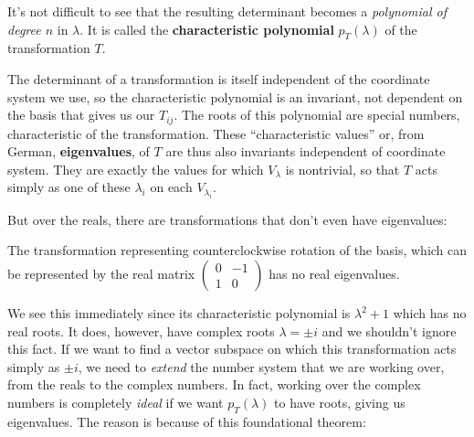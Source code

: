	 It's not difficult to see that the resulting determinant becomes a \emph{polynomial of degree $n$} in $\lambda$. It is called the \textbf{characteristic polynomial} $p_T(\lambda)$ of the transformation $T$.
	 
	 The determinant of a transformation is itself independent of the coordinate system we use, so the characteristic polynomial is an invariant, not dependent on the basis that gives us our $T_{ij}$. The roots of this polynomial are special numbers, characteristic of the transformation. These ``characteristic values'' or, from German, \textbf{eigenvalues}, of $T$ are thus also invariants independent of coordinate system. They are exactly the values for which $V_\lambda$ is nontrivial, so that $T$ acts simply as one of these $\lambda_i$ on each $V_{\lambda_i}$. 
	 
	 But over the reals, there are transformations that don't even have eigenvalues:
	 \begin{example}
	 	The transformation representing counterclockwise rotation of the basis, which can be represented by the real matrix $\begin{pmatrix}
	 		0 & -1 \\ 1 & 0
	 	\end{pmatrix}$
		has no real eigenvalues.
	 \end{example}
	 We see this immediately since its characteristic polynomial is $\lambda^2 + 1$ which has no real roots. It does, however, have complex roots $\lambda = \pm i$ and we shouldn't ignore this fact. If we want to find a vector subspace on which this transformation acts simply as $\pm i$, we need to \emph{extend} the number system that we are working over, from the reals to the complex numbers. In fact, working over the complex numbers is completely \emph{ideal} if we want $p_T(\lambda)$ to have roots, giving us eigenvalues. The reason is because of this foundational theorem:
	 
